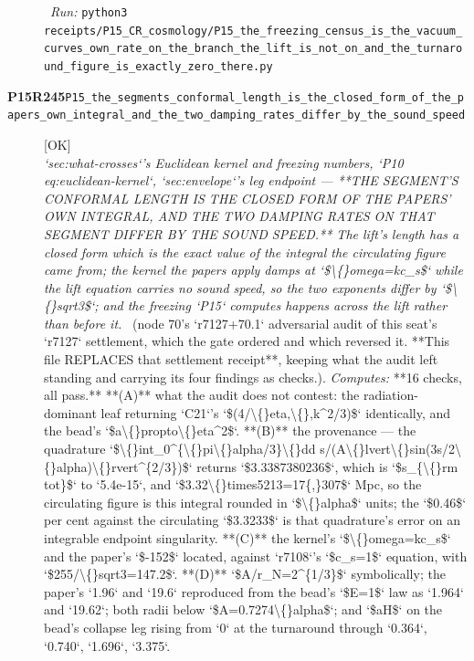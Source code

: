 \begin{description}
\ \emph{Run:} \texttt{python3 receipts/P15\_CR\_cosmology/P15\_the\_freezing\_census\_is\_the\_vacuum\_curves\_own\_rate\_on\_the\_branch\_the\_lift\_is\_not\_on\_and\_the\_turnaround\_figure\_is\_exactly\_zero\_there.py}
\item[\rcptlabel{P15_the_segments_conformal_length_is_the_closed_form_of_the_papers_own_integral_and_the_two_damping_rates_differ_by_the_sound_speed}{P15R245}\textbf{P15R245}\quad\texttt{P15\_the\_segments\_conformal\_length\_is\_the\_closed\_form\_of\_the\_papers\_own\_integral\_and\_the\_two\_damping\_rates\_differ\_by\_the\_sound\_speed}]\hfill\textsf{[OK]}\\
\textit{`sec:what-crosses`'s Euclidean kernel and freezing numbers, `P10 eq:euclidean-kernel`, `sec:envelope`'s leg endpoint ---  **THE SEGMENT'S CONFORMAL LENGTH IS THE CLOSED FORM OF THE PAPERS' OWN INTEGRAL, AND THE TWO DAMPING RATES ON THAT SEGMENT DIFFER BY THE SOUND SPEED.** The lift's length has a closed form which is the exact value of the integral the circulating figure came from; the kernel the papers apply damps at `\$\textbackslash\{\}omega=kc\_s\$` while the lift equation carries no sound speed, so the two exponents differ by `\$\textbackslash\{\}sqrt3\$`; and the freezing `P15` computes happens across the lift rather than before it.} \ (node 70's `r7127+70.1` adversarial audit of this seat's `r7127` settlement, which the gate ordered and which reversed it. **This file REPLACES that settlement receipt**, keeping what the audit left standing and carrying its four findings as checks.). 
\emph{Computes:} **16 checks, all pass.** **(A)** what the audit does not contest: the radiation-dominant leaf returning `C21`'s `\$(4/\textbackslash\{\}eta,\textbackslash\{\},k\textasciicircum{}2/3)\$` identically, and the bead's `\$a\textbackslash\{\}propto\textbackslash\{\}eta\textasciicircum{}2\$`. **(B)** the provenance --- the quadrature `\$\textbackslash\{\}int\_0\textasciicircum{}\{\textbackslash\{\}pi\textbackslash\{\}alpha/3\}\textbackslash\{\}dd s/(A\textbackslash\{\}lvert\textbackslash\{\}sin(3s/2\textbackslash\{\}alpha)\textbackslash\{\}rvert\textasciicircum{}\{2/3\})\$` returns `\$3.3387380236\$`, which is `\$s\_\{\textbackslash\{\}rm tot\}\$` to `5.4e-15`, and `\$3.32\textbackslash\{\}times5213=17\{,\}307\$` Mpc, so the circulating figure is this integral rounded in `\$\textbackslash\{\}alpha\$` units; the `\$0.46\$` per cent against the circulating `\$3.3233\$` is that quadrature's error on an integrable endpoint singularity. **(C)** the kernel's `\$\textbackslash\{\}omega=kc\_s\$` and the paper's `\$-152\$` located, against `r7108`'s `\$c\_s=1\$` equation, with `\$255/\textbackslash\{\}sqrt3=147.2\$`. **(D)** `\$A/r\_N=2\textasciicircum{}\{1/3\}\$` symbolically; the paper's `1.96` and `19.6` reproduced from the bead's `\$E=1\$` law as `1.964` and `19.62`; both radii below `\$A=0.7274\textbackslash\{\}alpha\$`; and `\$aH\$` on the bead's collapse leg rising from `0` at the turnaround through `0.364`, `0.740`, `1.696`, `3.375`.

\end{description}
